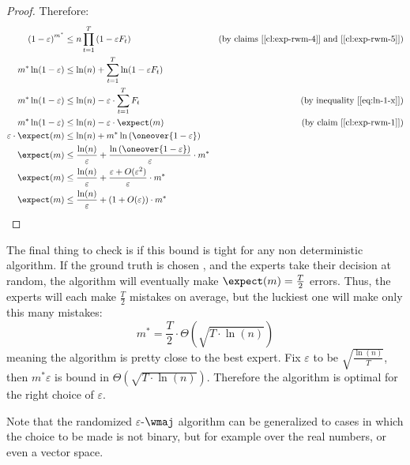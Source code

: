 \begin{proof}
    Therefore:
    \begin{align*}
        \left( 1 - \varepsilon \right)^{m^*}    &\leq n \prod_{t=1}^T \left( 1 - \varepsilon F_t \right)        & \text{(by claims [\ref{cl:exp-rwm-4}] and [\ref{cl:exp-rwm-5}])} \\
        m^* \ln(1 - \varepsilon)                &\leq \ln(n) + \sum_{t=1}^{T} \ln(1 - \varepsilon F_t)          & \\
        m^* \ln(1 - \varepsilon)                &\leq \ln(n) - \varepsilon \cdot \sum_{t=1}^{T} F_t             & \text{(by inequality [\ref{eq:ln-1-x}])} \\
        m^* \ln(1 - \varepsilon)                &\leq \ln(n) - \varepsilon \cdot \expect(m)                     & \text{(by claim [\ref{cl:exp-rwm-1}])} \\
        \varepsilon \cdot \expect(m)            &\leq \ln(n) + m^* \ln \left( \oneover{1 - \varepsilon} \right) & \\
        \expect(m)                              &\leq \frac{\ln(n)}{\varepsilon} + \frac{\ln \left( \oneover{1 - \varepsilon} \right)}{\varepsilon} \cdot m^* & \\
        \expect(m)                              &\leq \frac{\ln(n)}{\varepsilon} +  \frac{\varepsilon + O(\varepsilon^2)}{\varepsilon} \cdot m^* & \\
        \expect(m)                              &\leq \frac{\ln(n)}{\varepsilon} + \left( 1 + O(\varepsilon) \right) \cdot m^* &
    \end{align*}

\end{proof}

The final thing to check is if this bound is tight for any non deterministic algorithm. If the ground truth is chosen \uar, and the experts take their decision at random, the algorithm will eventually make $\expect(m) = \frac{T}{2}$ errors. Thus, the experts will each make $\frac{T}{2}$ mistakes on average, but the luckiest one will make only this many mistakes:
\[
    m^* = \frac{T}{2} \cdot \Theta\left( \sqrt{T \cdot \ln(n)} \right)
\]
meaning the algorithm is pretty close to the best expert. Fix $\varepsilon$ to be $\sqrt{\frac{\ln(n)}{T}}$, then $m^* \varepsilon$ is bound in $\Theta(\sqrt{T \cdot \ln(n)})$. Therefore the algorithm is optimal for the right choice of $\varepsilon$.

Note that the randomized $\varepsilon$-$\wmaj$ algorithm can be generalized to cases in which the choice to be made is not binary, but for example over the real numbers, or even a vector space.
